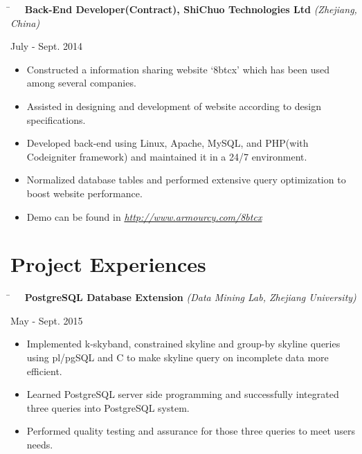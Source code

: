 \documentclass[10pt]{article} %
\begin{document}
\vspace{-1mm}
\parbox{0.5\textwidth}{ %
\begin{tabbing}
\hspace{4mm} \= \kill
\>\textbf{\ \ Back-End Developer(Contract), ShiChuo Technologies Ltd} \textit{(Zhejiang, China)}
\end{tabbing}
}
\hfill
\parbox{0.5\textwidth}{
\begin{tabbing}
July - Sept. 2014
\end{tabbing}
}
\vspace{-3mm}
\begin{itemize}[leftmargin=16mm]
		\item Constructed a information sharing website `8btcx' which has been used among several companies.
		\item Assisted in designing and development of website according to design specifications.
		\item Developed back-end using Linux, Apache, MySQL, and PHP(with Codeigniter framework) and maintained it in a 24/7 environment.
		\item Normalized database tables and performed extensive query optimization to boost website performance.
        \item Demo can be found in \textit{\underline{http://www.armourcy.com/8btcx}}
\end{itemize}



\section{Project Experiences}

\parbox{0.5\textwidth}{
\begin{tabbing}
\hspace{4mm} \= \kill
\>\textbf{\ \ PostgreSQL Database Extension} \textit{(Data Mining Lab, Zhejiang University)}
\end{tabbing}
}
\hfill
\parbox{0.5\textwidth}{
\begin{tabbing}
May - Sept. 2015
\end{tabbing}
}
\vspace{-3mm}
\begin{itemize}[leftmargin=16mm]
        \item Implemented k-skyband, constrained skyline and group-by skyline queries using pl/pgSQL and C to make skyline query on incomplete data more efficient.
        \item Learned PostgreSQL server side programming and successfully integrated three queries into PostgreSQL system.
        \item Performed quality testing and assurance for those three queries to meet users needs.
\end{itemize}
\end{document}
